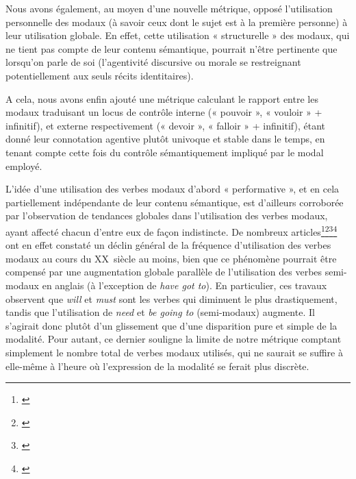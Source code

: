 Nous avons également, au moyen d’une nouvelle métrique, opposé l'utilisation personnelle des modaux (à savoir ceux dont le sujet est à la première personne) à leur utilisation globale. En effet, cette utilisation « structurelle » des modaux, qui ne tient pas compte de leur contenu sémantique, pourrait n’être pertinente que lorsqu'on parle de soi (l’agentivité discursive ou morale se restreignant potentiellement aux seuls récits identitaires).

A cela, nous avons enfin ajouté une métrique calculant le rapport entre les modaux traduisant un locus de contrôle interne (« pouvoir », « vouloir » + infinitif), et externe respectivement (« devoir », « falloir » + infinitif), étant donné leur connotation agentive plutôt univoque et stable dans le temps, en tenant compte cette fois du contrôle sémantiquement impliqué par le modal employé. 

L’idée d’une utilisation des verbes modaux d'abord « performative », et en cela partiellement indépendante de leur contenu sémantique, est d'ailleurs corroborée par l'observation de tendances globales dans l'utilisation des verbes modaux, ayant affecté chacun d'entre eux de façon indistincte. De nombreux articles\footnote{\cite{myhill_change_1995}}\footnote{\cite{smith_changes_2003}}\footnote{\cite{leech_change_nodate}}\footnote{\cite{aarts_modals_2013}} ont en effet constaté un déclin général de la fréquence d'utilisation des verbes modaux au cours du XX\ieme ~siècle au moins, bien que ce phénomène pourrait être compensé par une augmentation globale parallèle de l'utilisation des verbes semi-modaux en anglais (à l'exception de \textit{have got to}). En particulier, ces travaux observent que \textit{will} et \textit{must} sont les verbes qui diminuent le plus drastiquement, tandis que l’utilisation de \textit{need} et \textit{be going to} (semi-modaux) augmente. Il s’agirait donc plutôt d'un glissement que d'une disparition pure et simple de la modalité. Pour autant, ce dernier souligne la limite de notre métrique comptant simplement le nombre total de verbes modaux utilisés, qui ne saurait se suffire à elle-même à l'heure où l'expression de la modalité se ferait plus discrète.

